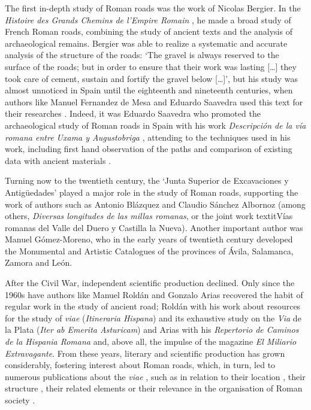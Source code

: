 	The first in-depth study of Roman roads was the work of Nicolas Bergier. In the \textit{Histoire des Grands Chemins de l’Empire Romain} \parencite{Bergier_1622}, he made a broad study of French Roman roads, combining the study of ancient texts and the analysis of archaeological remains. Bergier was able to realize a systematic and accurate analysis of the structure of the roads: ‘The gravel is always reserved to the surface of the roads; but in order to ensure that their work was lasting [\ldots] they took care of cement, sustain and fortify the gravel below [\ldots]’, but his study was almost unnoticed in Spain until the eighteenth and nineteenth centuries, when authors like Manuel Fernandez de Mesa and Eduardo Saavedra used this text for their researches \parencite[129--130]{Rodriguez_2010}. Indeed, it was Eduardo Saavedra who promoted the archaeological study of Roman roads in Spain with his work \textit{Descripción de la vía romana entre Uxama y Augustobriga} \parencite{Saavedra_1861}, attending to the techniques used in his work, including first hand observation of the paths and comparison of existing data with ancient materials \parencites[7]{Abásolo_1990}[199]{Arias_2002}.
	
	Turning now to the twentieth century, the ‘Junta Superior de Excavaciones y Antigüedades’ played a major role in the study of Roman roads, supporting the work of authors such as Antonio Blázquez and Claudio Sánchez Albornoz (among others, \textit{Diversas longitudes de las millas romanas}, or the joint work textit{Vías romanas del Valle del Duero y Castilla la Nueva}). Another important author was Manuel Gómez-Moreno, who in the early years of twentieth century developed the Monumental and Artistic Catalogues of the provinces of Ávila, Salamanca, Zamora and León.
	
	After the Civil War, independent scientific production declined. Only since the 1960s have authors like Manuel Roldán and Gonzalo Arias recovered the habit of regular work in the study of ancient road; Roldán with his work about resources for the study of \textit{viae} (\textit{Itineraria Hispana}) and its exhaustive study on the \textit{Via} de la Plata (\textit{Iter ab Emerita Asturicam}) and Arias with his \textit{Repertorio de Caminos de la Hispania Romana} and, above all, the impulse of the magazine \textit{El Miliario Extravagante}. From these years, literary and scientific production has grown considerably, fostering interest about Roman roads, which, in turn, led to numerous publications about the \textit{viae} \parencites{Blázquez_2006}{Chevallier_1997}{Moreno_2004}, such as in relation to their location \parencites{Morote_2002}{Roldán_1971}{Sillières_1990}, their structure \parencite{Moreno_2009}, their related elements \parencites{Arasa_1990}{Rodriguez_2004} or their relevance in the organisation of Roman society \parencites{Pisani_1994}{Ponte_2007}.

